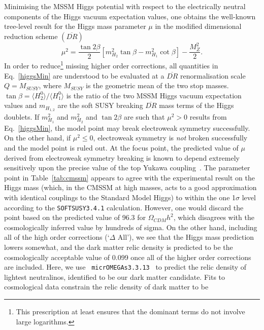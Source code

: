 \documentclass[final,3p,times,pdflatex]{elsarticle}
\begin{document}
Minimising the MSSM Higgs potential with respect to the electrically neutral
components of the Higgs vacuum expectation values, one obtains the well-known
tree-level result for the Higgs mass parameter $\mu$ in the modified
dimensional reduction 
scheme $(\overline{DR})$
\begin{equation}
\mu^2 = 
 \frac{\tan 2\beta}{2} \left[m_{{H}_2}^2\tan \beta
- m_{{H}_1}^2  \cot \beta \right] - \frac{M_Z^2}{2}. \label{higgsMin}
\end{equation}
In order to reduce\footnote{This prescription at least ensures that the
  dominant terms do not involve large logarithms.} missing higher order
corrections, 
all quantities in Eq.~\ref{higgsMin} are understood to be evaluated at a
$\overline{DR}$ renormalisation scale $Q=M_{SUSY}$, where $M_{SUSY}$ is the
geometric mean of the two stop masses.  
$\tan \beta=\langle H_2^0 \rangle / \langle H_1^0 \rangle$ is the ratio of the
two MSSM Higgs vacuum expectation values
 and $m_{{H}_{1,2}}$ are the soft SUSY breaking $\overline{DR}$ mass terms of
 the Higgs doublets.
If $m_{H_1}^2$ and $m_{H_2}^2$ and $\tan 2 \beta$ are such that $\mu^2>0$
results from Eq.~\ref{higgsMin}, the
model point may break electroweak symmetry successfully. On the other hand, if
$\mu^2 \le 0$, electroweak symmetry is {\em not}\/ broken successfully and the
model point is ruled out.
At the focus point,
the predicted value of $\mu$ derived from electroweak symmetry breaking is
known to 
depend extremely sensitively upon the precise value of the top Yukawa
coupling~\cite{Allanach:2000ii}. 
The parameter point in Table~\ref{tab:cmssm}
appears to agree with the experimental result on the Higgs
mass (which, in the CMSSM at high masses, acts to a good approximation with
identical couplings to the Standard Model Higgs)
to within the one 1$\sigma$ level according to the {\tt SOFTSUSY3.4.1}
calculation. However, one would discard the point based on the predicted value
of 96.3 for $\Omega_{CDM} h^2$, which disagrees with the cosmologically inferred
value by hundreds of sigma. On the other hand, including all of the high order
corrections (`$\Delta$ All'), we see that the Higgs mass prediction lowers
somewhat, and 
the dark matter 
relic density is predicted to be the cosmologically acceptable value of 0.099
once all of the higher order corrections are included.
Here, we use {\tt
  micrOMEGAs3.3.13}~\cite{Belanger:2001fz,Belanger:2004yn,Belanger:2013oya} to 
predict the relic density of 
lightest neutralinos, identified to be our dark matter candidate. 
Fits to cosmological data constrain the relic density of dark matter to be
\end{document}
